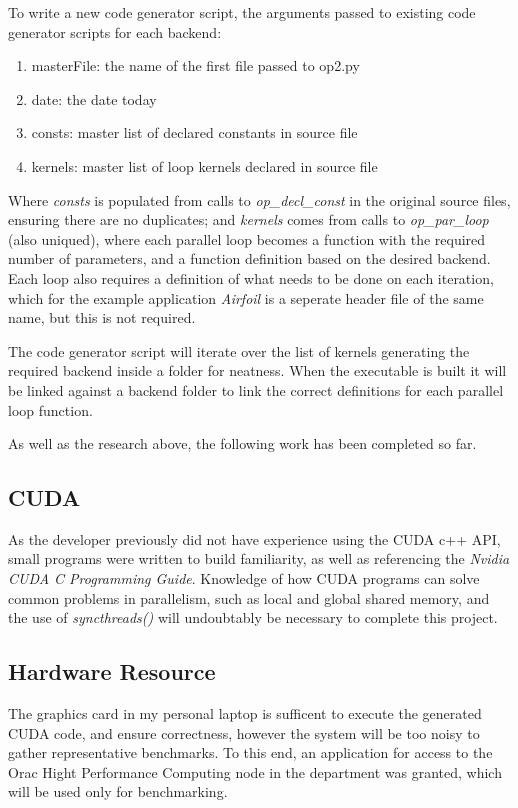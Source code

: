 \documentclass[11pt]{article}
\begin{document}
\par To write a new code generator script, the arguments passed to existing code generator scripts for each backend:
\begin{enumerate}
\item{masterFile: the name of the first file passed to op2.py}
\item{date: the date today}
\item{consts: master list of declared constants in source file}
\item{kernels: master list of loop kernels declared in source file}
\end{enumerate}
Where \textit{consts} is populated from calls to \textit{op\_decl\_const} in the original source files, ensuring there are no duplicates; and \textit{kernels} comes from calls to \textit{op\_par\_loop} (also uniqued), where each parallel loop becomes a function with the required number of parameters, and a function definition based on the desired backend. Each loop also requires a definition of what needs to be done on each iteration, which for the example application \textit{Airfoil} is a seperate header file of the same name, but this is not required.
\par The code generator script will iterate over the list of kernels generating the required backend inside a folder for neatness. When the executable is built it will be linked against a backend folder to link the correct definitions for each parallel loop function.

As well as the research above, the following work has been completed so far.
\subsection*{CUDA}
As the developer previously did not have experience using the CUDA c++ API, small programs were written to build familiarity, as well as referencing the \textit{Nvidia CUDA C Programming Guide}. Knowledge of how CUDA programs can solve common problems in parallelism, such as local and global shared memory, and the use of \textit{syncthreads()} will undoubtably be necessary to complete this project.

\subsection*{Hardware Resource}
The graphics card in my personal laptop is sufficent to execute the generated CUDA code, and ensure correctness, however the system will be too noisy to gather representative benchmarks. To this end, an application for access to the Orac Hight Performance Computing node in the department was granted, which will be used only for benchmarking.
\end{document}
